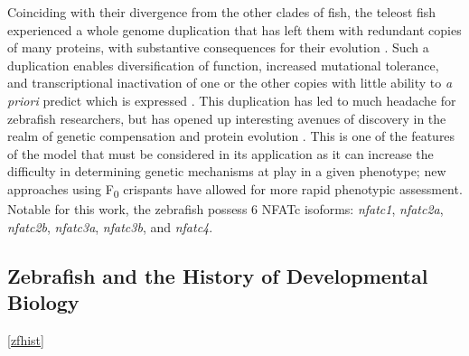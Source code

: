 Coinciding with their divergence from the other clades of fish, the teleost fish experienced a whole genome duplication that has left them with redundant copies of many proteins, with substantive consequences for their evolution \citep{Amores2011, Glasauer2014, Howe2013, Meyer1999}. Such a duplication enables diversification of function, increased mutational tolerance, and transcriptional inactivation of one or the other copies with little ability to \textit{a priori} predict which is expressed \citep{Opazo2013, Voldoire2017}. This duplication has led to much headache for zebrafish researchers, but has opened up interesting avenues of discovery in the realm of genetic compensation and protein evolution \citep{Rossi2015, ElBrolosy2017, ElBrolosy2019, Sztal2020, Stainier2015, Moleri2011, Boudinot2011, Stainier2017, Kontarakis2020}. This is one of the features of the model that must be considered in its application as it can increase the difficulty in determining genetic mechanisms at play in a given phenotype; new approaches using F\textsubscript{0} crispants have allowed for more rapid phenotypic assessment. Notable for this work, the zebrafish possess 6 NFATc isoforms: \textit{nfatc1}, \textit{nfatc2a}, \textit{nfatc2b}, \textit{nfatc3a}, \textit{nfatc3b}, and \textit{nfatc4}.

\subsection{Zebrafish and the History of Developmental Biology}\autoref{zfhist}

